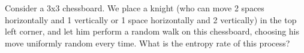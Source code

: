 \documentclass[a4paper,10pt,landscape,twocolumn]{scrartcl}
\begin{document}









\begin{exercise}
Consider a 3x3 chessboard. We place a knight (who can move 2 spaces horizontally and 1 vertically or 1 space horizontally and 2 vertically) in the top left corner, and let him perform a random walk on this chessboard, choosing his move uniformly random every time. What is the entropy rate of this process?
\end{exercise}
\end{document}
